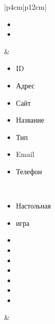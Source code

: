 \begin{table}[h!]
\begin{center}
\begin{threeparttable}
\begin{tabular}{|p{4cm}|p{12cm}|}
\begin{minipage}[t]{\linewidth}
\begin{multicols}{1}
\begin{itemize}[labelsep=0mm,nosep,after=\strut]
                  \item[]
                  \item[]
                \end{itemize}
              \end{multicols}
            \end{minipage}
          & \begin{minipage}[t]{\linewidth}
              \begin{multicols}{2}
                \begin{itemize}[labelsep=0mm,nosep,after=\strut]
                  \item[] ID
                  \item[] Адрес
                  \item[] Сайт
                  \item[] Название
                  \item[] Тип
                  \item[] Email
                  \item[] Телефон
                \end{itemize}
              \end{multicols}
            \end{minipage}\\
            \hline
            \begin{minipage}[t]{\linewidth}
              \begin{multicols}{1}
                \begin{itemize}[labelsep=0mm,nosep,after=\strut]
                  \item[] Настольная
                  \item[] игра
                  \item[]
                  \item[]
                  \item[]
                  \item[]
                  \item[]
                  \item[]
                  \item[]
                \end{itemize}
              \end{multicols}
            \end{minipage}
          & \begin{minipage}[t]{\linewidth}
              \begin{multicols}{2}

\end{multicols}
\end{minipage}
\end{tabular}
\end{threeparttable}
\end{center}
\end{table}
